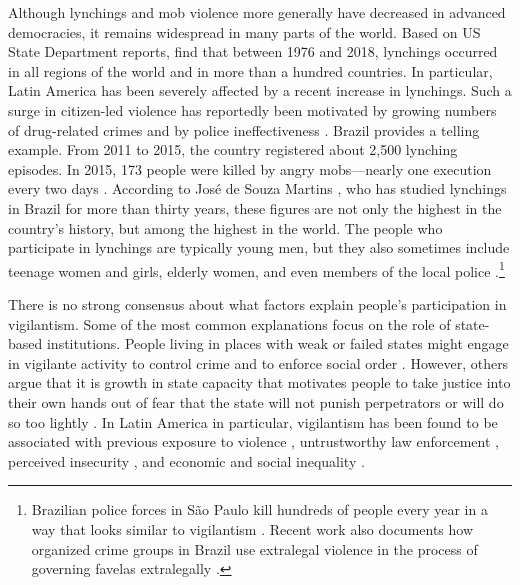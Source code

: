 \documentclass[12pt,ansiapaper]{article}
\begin{document}
Although lynchings and mob violence more generally have decreased in advanced democracies, it remains widespread in many parts of the world. Based on US State Department reports, \citet[33]{jung2020lynching} find that between 1976 and 2018, lynchings occurred in all regions of the world and in more than a hundred countries. In particular, Latin America has been severely affected by a recent increase in lynchings. Such a surge in citizen-led violence has reportedly been motivated by growing numbers of drug-related crimes and by police ineffectiveness \citep{mallen2014vigilantes}. Brazil provides a telling example. From 2011 to 2015, the country registered about 2,500 lynching episodes. In 2015, 173 people were killed by angry mobs---nearly one execution every two days \citep{barbara2015vigilantes, oliveira2016mob}. According to José de Souza Martins \citeyearpar{martins2015linchamentos}, who has studied lynchings in Brazil for more than thirty years, these figures are not only the highest in the country's history, but among the highest in the world. The people who participate in lynchings are typically  young men, but they also sometimes include teenage women and girls, elderly women, and even members of the local police \citep{moura2017linchamentos}.\footnote{Brazilian police forces in São Paulo kill hundreds of people every year in a way that looks similar to vigilantism \citep{willis2015killing}. Recent work also documents how organized crime groups in Brazil use extralegal violence in the process of governing favelas extralegally \citep{magaloni2020killing}.}

There is no strong consensus about what factors explain people's participation in vigilantism. Some of the most common explanations focus on the role of state-based institutions. People living in places with weak or failed states might engage in vigilante activity to control crime and to enforce social order \citep{bancroft1887works}. However, others argue that it is growth in state capacity that motivates people to take justice into their own hands out of fear that the state will not punish perpetrators or will do so too lightly \citep{smith2019contradictions}. In Latin America in particular, vigilantism has been found to be associated with previous exposure to violence \citep{garcia2019anger}, untrustworthy law enforcement \citep{zizumbo2017community}, perceived insecurity \citep{ceobanu2011crime, godoy2004justice}, and economic and social inequality \citep{phillips2017inequality,godoy2006popular,arias2010violent}.
\end{document}
